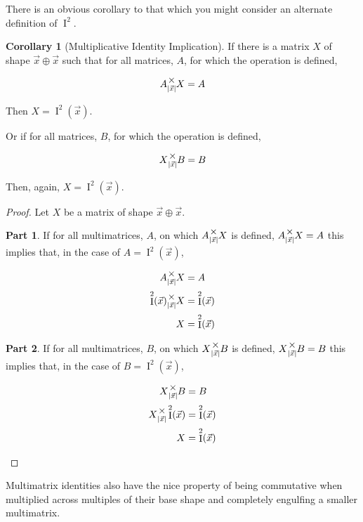 \documentclass[12pt]{book}
\theoremstyle{plain}
\theoremstyle{definition}
\newtheorem{corollary}{Corollary}[theorem]
\theoremstyle{ppart}
\newtheorem{ppart}{Part}
\theoremstyle{case}
\theoremstyle{solution}
\DeclareMathOperator{\Ident}{I}
\newcommand{\mmult}[1]{\text{\raisebox{1ex}{$\underset{#1}{\times}$}}}
\newcommand{\shape}[1]{\left|#1\right|}
\begin{document}
There is an obvious corollary to that which you might consider an
alternate definition of $\Ident^2$.

\begin{corollary}[Multiplicative Identity Implication]
\label{mm_ident_imp}
If there is a matrix $X$ of shape $\vec{x} \oplus \vec{x}$ such that
for all matrices, $A$, for which the operation is defined,

\[A \mmult{\shape{\vec{x}}} X = A \]

Then $X = \Ident^2(\vec{x})$.

Or if for all matrices, $B$, for which the operation is defined,

\[X \mmult{\shape{\vec{x}}} B = B \]

Then, again, $X = \Ident^2(\vec{x})$.
\end{corollary}
\begin{proof}
Let $X$ be a matrix of shape $\vec{x} \oplus \vec{x}$. 
\begin{ppart}
If for all multimatrices, $A$, on which $A \mmult{\shape{\vec{x}}} X$ is defined, 
$A \mmult{\shape{\vec{x}}} X = A$ this implies that, in the case of $A = \Ident^2(\vec{x})$,

\begin{align*}
  A \mmult{\shape{\vec{x}}} X &= A \\
 \Ident^2(\vec{x}) \mmult{\shape{\vec{x}}} X &= \Ident^2(\vec{x}) \\
  X &= \Ident^2(\vec{x}) 
\end{align*}
\end{ppart}
\begin{ppart}
If for all multimatrices, $B$, on which $X \mmult{\shape{\vec{x}}} B$ is defined, 
$X \mmult{\shape{\vec{x}}} B = B$ this implies that, in the case of $B = \Ident^2(\vec{x})$,

\begin{align*}
  X \mmult{\shape{\vec{x}}} B &= B \\
  X \mmult{\shape{\vec{x}}} \Ident^2(\vec{x}) &= \Ident^2(\vec{x}) \\
  X &= \Ident^2(\vec{x}) 
\end{align*}
\end{ppart}
\end{proof}

Multimatrix identities also have the nice property of being commutative when multiplied
across multiples of their base shape and completely engulfing a smaller multimatrix.
\end{document}
